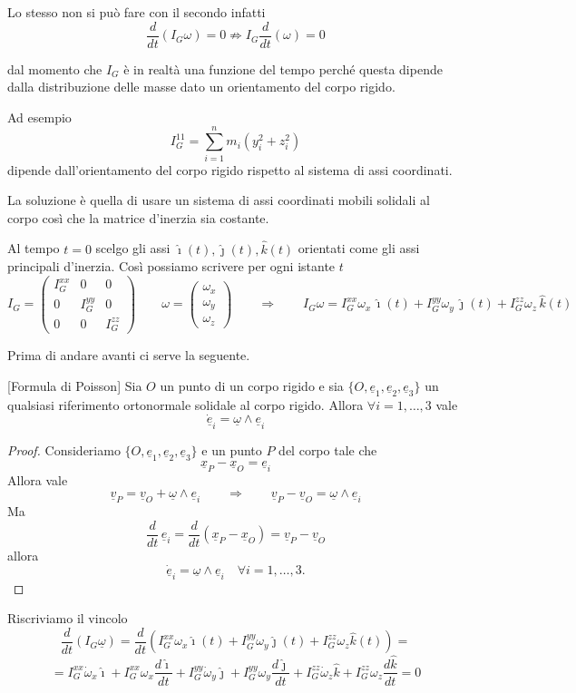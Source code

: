 Lo stesso non si può fare con il secondo infatti
\[
\frac{d}{dt}\left(I_G\omega\right)=0 \not\Rightarrow I_G\frac{d}{dt}(\omega)=0
\]

dal momento che $I_G$ è in realtà una funzione del tempo perché questa dipende dalla distribuzione delle masse dato un orientamento del corpo rigido.

Ad esempio
\[
I_G^{11}=\sum_{i=1}^{n}m_i\left(y_i^2+z_i^2\right)
\]
dipende dall'orientamento del corpo rigido rispetto al sistema di assi coordinati.

La soluzione è quella di usare un sistema di assi coordinati mobili solidali al corpo così che la matrice d'inerzia sia costante.

Al tempo $t=0$ scelgo gli assi $\hat{\imath}(t),\hat{\jmath}(t),\hat{k}(t)$ orientati come gli assi principali d'inerzia. Così possiamo scrivere per ogni istante $t$
\[
I_G=
\begin{pmatrix}
I_G^{xx} & 0 & 0\\
0 & I_G^{yy} & 0\\
0 & 0 & I_G^{zz}
\end{pmatrix}
\qquad
\omega=
\begin{pmatrix}
\omega_x\\
\omega_y\\
\omega_z
\end{pmatrix}
\qquad \Rightarrow \qquad
I_G\omega = I_G^{xx}\omega_x\,\hat{\imath}(t)+I_G^{yy}\omega_y\,\hat{\jmath}(t)+I_G^{zz}\omega_z\,\hat{k}(t)
\]

Prima di andare avanti ci serve la seguente.

\begin{lemma}{}[Formula di Poisson]
Sia $O$ un punto di un corpo rigido e sia $\{O,\underline{e}_1,\underline{e}_2,\underline{e}_3\}$ un qualsiasi riferimento ortonormale solidale al corpo rigido. Allora $\forall i=1,\ldots,3$ vale
\[
\dot{\underline{e}}_i=\underline{\omega}\wedge\underline{e}_i
\]
\end{lemma}
\inizioapprof
\begin{proof}
Consideriamo $\{O,\underline{e}_1,\underline{e}_2,\underline{e}_3\}$ e un punto $P$ del corpo tale che
\[
\underline{x}_P-\underline{x}_O=\underline{e}_i
\]
Allora vale
\[
\underline{v}_P=\underline{v}_O+\underline{\omega}\wedge\underline{e}_i
\qquad\Rightarrow\qquad
\underline{v}_P-\underline{v}_O=\underline{\omega}\wedge\underline{e}_i
\]
Ma
\[
\frac{d}{dt}\,\underline{e}_i=\frac{d}{dt}\left(\underline{x}_P-\underline{x}_O\right)=\underline{v}_P-\underline{v}_O
\]
allora
\[
\dot{\underline{e}}_i=\underline{\omega}\wedge\underline{e}_i \quad \forall i = 1 , \ldots , 3.
\]


\end{proof}
\fineapprof
Riscriviamo il vincolo
\[
\frac{d}{dt}\left(I_G\underline{\omega}\right)=
\frac{d}{dt}\left(I_G^{xx}\omega_x\hat{\imath}(t)+I_G^{yy}\omega_y\hat{\jmath}(t)+I_G^{zz}\omega_z\hat{k}(t)\right)=
\]
\[
= I_G^{xx}\dot{\omega}_x\hat{\imath}
+ I_G^{xx}\omega_x\frac{d\hat{\imath}}{dt}
+ I_G^{yy}\dot{\omega}_y\hat{\jmath}
+ I_G^{yy}\omega_y\frac{d\hat{\jmath}}{dt}
+ I_G^{zz}\dot{\omega}_z\hat{k}
+ I_G^{zz}\omega_z\frac{d\hat{k}}{dt}
=0
\]

